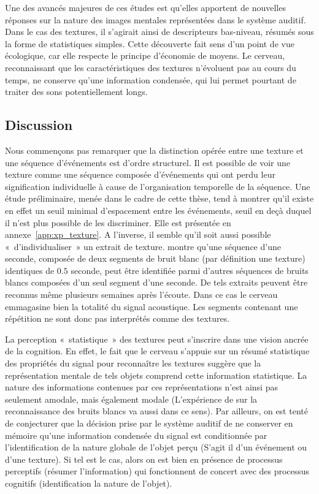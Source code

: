 Une des avancés majeures de ces études est qu'elles apportent de nouvelles réponses sur la nature des images mentales représentées dans le système auditif. Dans le cas des textures, il s'agirait ainsi de descripteurs bas-niveau, résumés sous la forme de statistiques simples. Cette découverte fait sens d'un point de vue écologique, car elle respecte le principe d'économie de moyens. Le cerveau, reconnaissant que les caractéristiques des textures n'évoluent pas au cours du temps, ne conserve qu'une information condensée, qui lui permet pourtant de traiter des sons potentiellement longs. 

\subsection{Discussion}
\label{sec:ch3_textureDiscussion}

Nous commençons pas remarquer que la distinction opérée entre une texture et une séquence d'événements est d'ordre structurel. Il est possible de voir une texture comme une séquence composée d'événements qui ont perdu leur signification individuelle à cause de l'organisation temporelle de la séquence. Une étude préliminaire, menée dans le cadre de cette thèse, tend à montrer qu'il existe en effet un seuil minimal d'espacement entre les événements, seuil en deçà duquel il n'est plus possible de les discriminer. Elle est présentée en annexe~\ref{app:xp_texture}. A l'inverse, il semble qu'il soit aussi possible «~d'individualiser~» un extrait de texture. \citep{agus2010rapid} montre qu'une séquence d'une seconde, composée de deux segments de bruit blanc (par définition une texture) identiques de $0.5$ seconde, peut être identifiée parmi d'autres séquences de bruits blancs composées d'un seul segment d'une seconde. De tels extraits peuvent être reconnus même plusieurs semaines après l'écoute. Dans ce cas le cerveau emmagasine bien la totalité du signal acoustique. Les segments contenant une répétition ne sont donc pas interprétés comme des textures.

La perception «~statistique~» des textures peut s'inscrire dans une vision ancrée de la cognition. En effet, le fait que le cerveau s'appuie sur un résumé statistique des propriétés du signal pour reconnaître les textures suggère que la représentation mentale de tels objets comprend cette information statistique. La nature des informations contenues par ces représentations n'est ainsi pas seulement amodale, mais également modale (L'expérience de \citep{agus2010rapid} sur la reconnaissance des bruits blancs va aussi dans ce sens). Par ailleurs, on est tenté de conjecturer que la décision prise par le système auditif de ne conserver en mémoire qu'une information condensée du signal est conditionnée par l'identification de la nature globale de l'objet perçu (S'agit il d'un événement ou d'une texture). Si tel est le cas, alors on est bien en présence de processus perceptifs (résumer l'information) qui fonctionnent de concert avec des processus cognitifs (identification la nature de l'objet).

